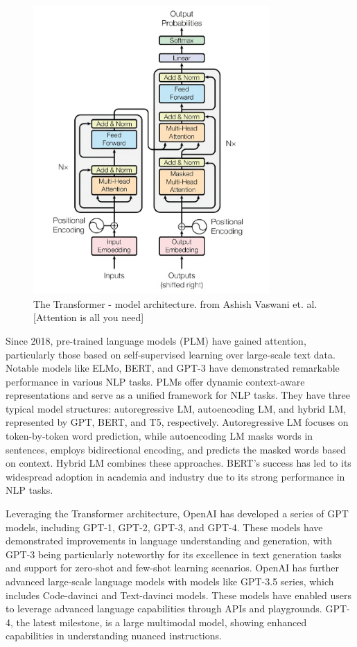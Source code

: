 \documentclass[conference]{IEEEtran}
\begin{document}
\begin{figure}[htp]
    \includegraphics[width=9cm]{transformer}
    \caption{The Transformer - model architecture. from Ashish Vaswani et. al. [Attention is all you need]}
    \label{fig:galaxy}
\end{figure}

Since 2018, pre-trained language models (PLM) have gained attention, particularly those based on self-supervised learning over large-scale text data. Notable models like ELMo, BERT, and GPT-3 have demonstrated remarkable performance in various NLP tasks. PLMs offer dynamic context-aware representations and serve as a unified framework for NLP tasks. They have three typical model structures: autoregressive LM, autoencoding LM, and hybrid LM, represented by GPT, BERT, and T5, respectively. Autoregressive LM focuses on token-by-token word prediction, while autoencoding LM masks words in sentences, employs bidirectional encoding, and predicts the masked words based on context. Hybrid LM combines these approaches. BERT's success has led to its widespread adoption in academia and industry due to its strong performance in NLP tasks.

Leveraging the Transformer architecture, OpenAI has developed a series of GPT models, including GPT-1, GPT-2, GPT-3, and GPT-4. These models have demonstrated improvements in language understanding and generation, with GPT-3 being particularly noteworthy for its excellence in text generation tasks and support for zero-shot and few-shot learning scenarios. OpenAI has further advanced large-scale language models with models like GPT-3.5 series, which includes Code-davinci and Text-davinci models. These models have enabled users to leverage advanced language capabilities through APIs and playgrounds. GPT-4, the latest milestone, is a large multimodal model, showing enhanced capabilities in understanding nuanced instructions.
\end{document}

